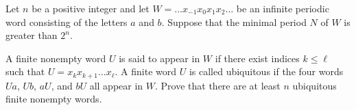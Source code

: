 Let $n$ be a positive integer and let $W = \ldots x_{-1} x_0 x_1 x_2 \ldots$ be an infinite periodic word consisting of the letters $a$ and $b$. Suppose that the minimal period $N$ of $W$ is greater than $2^n$.

A finite nonempty word $U$ is said to appear in $W$ if there exist indices $k \leq \ell$ such that $U = x_k x_{k+1} \ldots x_\ell$. A finite word $U$ is called ubiquitous if the four words $Ua$, $Ub$, $aU$, and $bU$ all appear in $W$. Prove that there are at least $n$ ubiquitous finite nonempty words.
